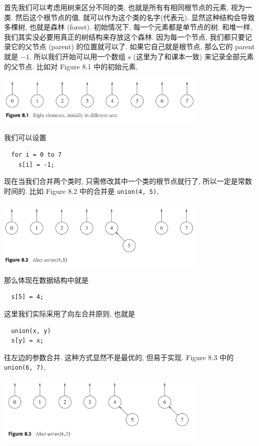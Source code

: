 \documentclass[a4paper]{ctexart}
\theoremstyle{definition}
\theoremstyle{definition}
\begin{document}
首先我们可以考虑用树来区分不同的类, 也就是所有有相同根节点的元素, 视为一类. 
然后这个根节点的值, 就可以作为这个类的名字(代表元). 显然这种结构会导致多棵树, 
也就是森林 (forest). 初始情况下, 每一个元素都是单节点的树. 和堆一样, 
我们其实没必要用真正的树结构来存放这个森林. 因为每一个节点, 我们都只要记录它的父节点 (parent) 的位置就可以了. 
如果它自己就是根节点, 那么它的 parent 就是 $-1$. 所以我们开始可以用一个数组 $s$ (这里为了和课本一致) 
来记录全部元素的父节点. 比如对 Figure 8.1 中的初始元素, 
\begin{center}
  \includegraphics[width=0.75\textwidth]{images/FIG8_1.png}
\end{center}
我们可以设置
\begin{lstlisting}
  for i = 0 to 7
    s[i] = -1;
\end{lstlisting}
现在当我们合并两个类时, 只需修改其中一个类的根节点就行了, 所以一定是常数时间的. 
比如 Figure 8.2 中的合并是 \verb|union(4, 5)|, 
\begin{center}
  \includegraphics[width=0.75\textwidth]{images/FIG8_2.png}
\end{center}
那么体现在数据结构中就是 
\begin{lstlisting}
  s[5] = 4;
\end{lstlisting}
这里我们实际采用了向左合并原则, 也就是
\begin{lstlisting}
  union(x, y)
  s[y] = x;
\end{lstlisting}
往左边的参数合并. 这种方式显然不是最优的, 但易于实现.
Figure 8.3 中的 \verb|union(6, 7)|, 
\begin{center}
  \includegraphics[width=0.75\textwidth]{images/FIG8_3.png}
\end{center}
\end{document}
